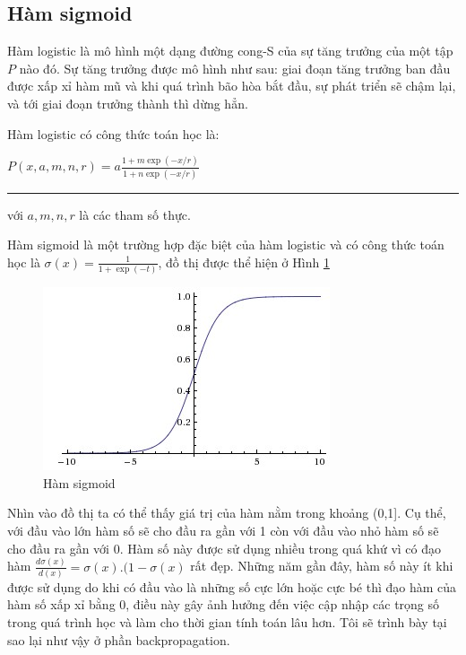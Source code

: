 \subsection{ Hàm sigmoid}
	 Hàm logistic là mô hình một dạng đường cong-S của sự tăng trưởng của một tập $P$ nào đó. Sự tăng trưởng được mô hình như sau: giai đoạn tăng trưởng ban đầu được xấp xỉ hàm mũ và khi quá trình bão hòa bắt đầu, sự phát triển sẽ chậm lại, và tới giai đoạn trưởng thành thì dừng hẳn. \par 
	 Hàm logistic có công thức toán học là: 
	 \begin{center}
	 	$P(x,a,m,n,r) = a\frac{1+m\exp({-x/r})}{1+n\exp({-x/r})}$ \rule{5mm}{0pt} với $a,m,n,r$ là các tham số thực.
	 \end{center}
	 \par
	  Hàm sigmoid là một trường hợp đặc biệt của hàm logistic và có công thức toán học là $\sigma(x) = \frac{1}{1+\exp({-t})}$, đồ thị được thể hiện ở Hình \ref{fig:sigmoid}
\begin{center}
 	\begin{figure}[htp]
    \begin{center}
    \includegraphics[scale=1]{chap3/image/sigmoid.jpeg}
    \end{center}
    \caption{Hàm sigmoid}
    \label{fig:sigmoid}
    \end{figure}
\end{center}
Nhìn vào đồ thị ta có thể thấy giá trị của hàm nằm trong khoảng (0,1]. Cụ thể, với đầu vào lớn hàm số sẽ cho đầu ra gần với 1 còn với đầu vào nhỏ hàm số sẽ cho đầu ra gần với 0. Hàm số này được sử dụng nhiều trong quá khứ vì có đạo hàm $\frac{d\sigma(x)}{d(x)} = \sigma(x).(1-\sigma(x)$ rất đẹp. Những năm gần đây, hàm số này ít khi được sử dụng do khi có đầu vào là những số cực lớn hoặc cực bé thì đạo hàm của hàm số xấp xỉ bằng 0, điều này gây ảnh hưởng đến việc cập nhập các trọng số trong quá trình học và làm cho thời gian tính toán lâu hơn. Tôi sẽ trình bày tại sao lại như vậy ở phần backpropagation.
	
